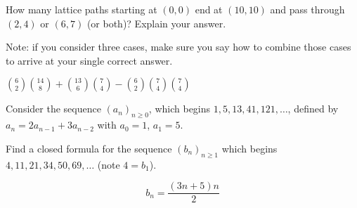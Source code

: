 \documentclass[11pt]{exam}
\begin{document}
\begin{questions}
\begin{parts}
\end{parts}






\question[4] How many lattice paths starting at $(0,0)$ end at $(10,10)$ and pass through $(2,4)$ or $(6,7)$ (or both)?  Explain your answer.

Note: if you consider three cases, make sure you say how to combine those cases to arrive at your single correct answer.
\begin{solution}
	${6 \choose 2}{14 \choose 8}+{13\choose 6}{7 \choose 4} - {6 \choose 2}{7 \choose 4}{7 \choose 4}$
\end{solution}
\vfill
\vfill

\newpage

\question Consider the sequence $(a_n)_{n\ge 0}$, which begins $1,5,13,41,121,\ldots$, defined by $a_n = 2a_{n-1} + 3a_{n-2}$ with $a_0 = 1$, $a_1 = 5$.



\question[5] Find a closed formula for the sequence $(b_n)_{n \ge 1}$ which begins $4, 11, 21, 34, 50, 69, \ldots$ (note $4 = b_1$).
	\begin{solution}

	\[b_n = \frac{(3n+5)n}{2}\]

	\end{solution}
	\vfill
	\vfill



\end{questions}
\end{document}
